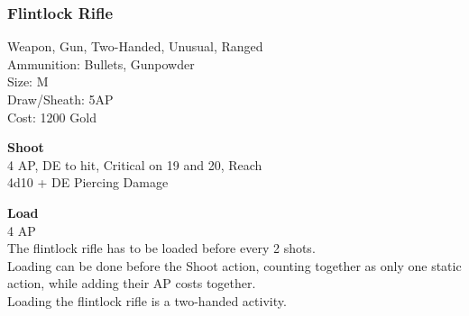 \subsubsection{Flintlock Rifle}\label{weapon:flintlockRifle}
Weapon, Gun, Two-Handed, Unusual, Ranged\\
Ammunition: Bullets, Gunpowder\\
Size: M\\
Draw/Sheath: 5AP\\
Cost: 1200 Gold

\textbf{Shoot} \\
4 AP, DE to hit, Critical on 19 and 20,  Reach\\
4d10 + DE Piercing Damage

\textbf{Load} \\
4 AP\\
The flintlock rifle has to be loaded before every 2 shots.\\
Loading can be done before the Shoot action, counting together as only one static action, while adding their AP costs together.\\
Loading the flintlock rifle is a two-handed activity.

